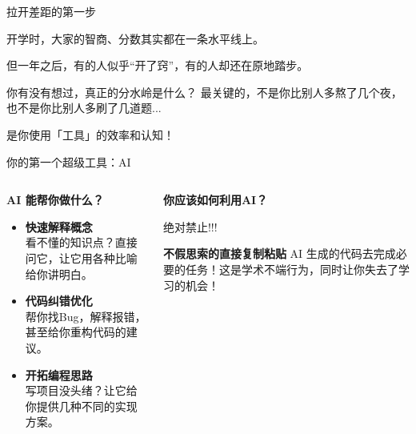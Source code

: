 \documentclass{beamer}
\begin{document}
\begin{frame}{拉开差距的第一步}
    \begin{center}
        \Large
        开学时，大家的智商、分数其实都在一条水平线上。
        \vspace{0.5cm}

        但一年之后，有的人似乎“开了窍”，有的人却还在原地踏步。
    \end{center}
    \vfill

    \begin{alertblock}{你有没有想过，真正的分水岭是什么？}
        最关键的，不是你比别人多熬了几个夜，也不是你比别人多刷了几道题...
        \vspace{0.5cm}
        \begin{center}
            \Huge\alert{是你使用「工具」的效率和认知！}
        \end{center}
    \end{alertblock}

\end{frame}

\begin{frame}{你的第一个超级工具：AI}
    \begin{columns}[T]
        \begin{column}{0.5\textwidth}
            \Large\textbf{AI 能帮你做什么？}
            \begin{itemize}
                \item \textbf{快速解释概念} \\
                \small 看不懂的知识点？直接问它，让它用各种比喻给你讲明白。
                \item \textbf{代码纠错优化} \\
                \small 帮你找Bug，解释报错，甚至给你重构代码的建议。
                \item \textbf{开拓编程思路} \\
                \small 写项目没头绪？让它给你提供几种不同的实现方案。
            \end{itemize}
        \end{column}
        
        \begin{column}{0.5\textwidth}
            \Large\textbf{你应该如何利用AI？}
            \vspace{0.3cm}

            
            \begin{alertblock}{绝对禁止!!!}

            \textbf{不假思索的直接复制粘贴} AI 生成的代码去完成必要的任务！这是\alert{学术不端}行为，同时让你失去了学习的机会！

            \end{alertblock}

        \end{column}
    \end{columns}
\end{frame}
\end{document}

